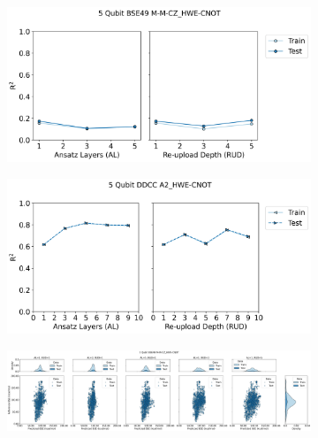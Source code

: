 \documentclass[journal=jacsat,manuscript=article]{achemso}
\begin{document}
\begin{figure}[H]
	\centering	
	\begin{subfigure}[b]{0.49\textwidth}
		\centering
		\includegraphics[width=\linewidth]{../images/BSE/fivequbit/BSE5_RUDAL_lineplot}
		\caption{}
		\label{fig:bse5RUDAL_lineplot}
	\end{subfigure}
	\hfill
	\begin{subfigure}[b]{0.49\textwidth}
		\centering
		\includegraphics[width=\linewidth]{../images/DDCC/DDCC_RUDAL_lineplot}
		\caption{}
		\label{fig:ddccRUDAL_lineplot}
	\end{subfigure}
	\hfill	
	\begin{subfigure}[b]{0.49\textwidth}
		\centering
		\includegraphics[width=\linewidth]{../images/BSE/fivequbit/distribution_parity}
		\caption{}
		\label{fig:BSE5_distribution_parity}
	\end{subfigure}
	\hfill


\end{figure}
\end{document}
